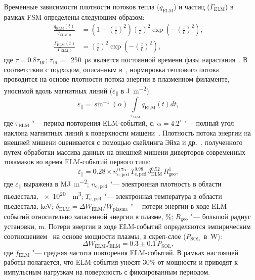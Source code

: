 Временные зависимости плотности потоков тепла (\( q_\mathrm{ELM} \)) и частиц (\( \Gamma_\mathrm{ELM} \)) в рамках FSM определены следующим образом:
\begin{subequations}
	\label{eq:ch3/elm_fluxes}
	\begin{align}
		\frac{q_{\mathrm{ELM}}(t)}{q_{\mathrm{ELM,0}}}           & =\left(1+\left(\frac{\tau}{t}\right)^2\right)\left(\frac{\tau}{t}\right)^2\exp\left(-\left(\frac{\tau}{t}\right)^2\right),\label{eq:elm_heat_flux} \\
		\frac{\Gamma_{\mathrm{ELM}}(t)}{\Gamma_{\mathrm{ELM,0}}} & =\left(\frac{\tau}{t}\right)^2\exp\left(-\left(\frac{\tau}{t}\right)^2\right), \label{eq:elm_part_flux}
	\end{align}
\end{subequations}
где $\tau=\num{0.8}\tau_{\mathrm{IR}}$; $\tau_{\mathrm{IR}}=$~\SI{250}{\micro\second} является постоянной времени фазы нарастания~\cite{Eich2017}. В соответствии с подходом, описанным в~\cite{VandenKerkhof2021}, нормировка теплового потока проводится на основе плотности потока энергии в плазменном филаменте, уносимой вдоль магнитных линий ($\varepsilon_\parallel$ в \si{\joule\per\meter\squared}):
\begin{equation}
	\label{eq:ch3/norm_elm_hf}
	\varepsilon_\parallel=\sin^{-1}(\alpha)\,\int\limits_{\tau_{\mathrm{ELM}}}q_{\mathrm{ELM}}(t)dt,
\end{equation}
где $\tau_{\mathrm{ELM}}$ "--- период повторения ELM-событий, с; $\alpha=4.2^{\circ}$ "--- полный угол наклона магнитных линий к поверхности мишени~\cite{Pitts2019, Eich2017, Pitts2017}. Плотность потока энергии на внешней мишени оценивается с помощью скейлинга Эйха и др.~\cite{Eich2017}, полученного путем обработки массива данных на внешней мишени диверторов современных токамаков во время ELM-событий первого типа:
\begin{equation}
	\label{eq:ch3/parallel_elm_fluence}
	\varepsilon_\parallel=0.28\times n_{\mathrm{e,ped}}^{0.75}\, T_{\mathrm{e,ped}}^{0.98}\, \delta_{\mathrm{ELM}}^{0.52}\, R_{\mathrm{geo}}^{1},
\end{equation}
где $\varepsilon_\parallel$ выражена в \si{\mega\joule\per\meter\squared}; $n_{\mathrm{e,ped}}$ "--- электронная плотность в области пьедестала, \SI{e20}{\per\meter\cubed}; $T_{\mathrm{e,ped}}$ "--- электронная температура в области пьедестала, \si{\kilo\electronvolt}; $\delta_{\mathrm{ELM}}=\Delta W_{\mathrm{ELM}}/W_{\mathrm{plasma}}$ "--- потери энергии в ходе ELM-событий относительно запасенной энергии в плазме, \si{\percent}; $R_{\mathrm{geo}}$ "--- большой радиус установки, \si{\meter}. Потери энергии в ходе ELM-событий определяются эмпирическим соотношением~\cite{Loarte2002} на основе мощности плазмы, в скреп-слое ($P_{\mathrm{SOL}}$~в~\si{\watt}):
\begin{equation}
	\Delta W_{\mathrm{ELM}} f_{\mathrm{ELM}}=0.3\pm 0.1 \, P_{\mathrm{SOL}},
\end{equation}
где $f_{\mathrm{ELM}}$ "--- средняя частота повторения ELM-событий. В рамках настоящей работы полагается, что ELM-события уносят 30\% от мощности и приводят к импульсным нагрузкам на поверхность с фиксированным периодом.

